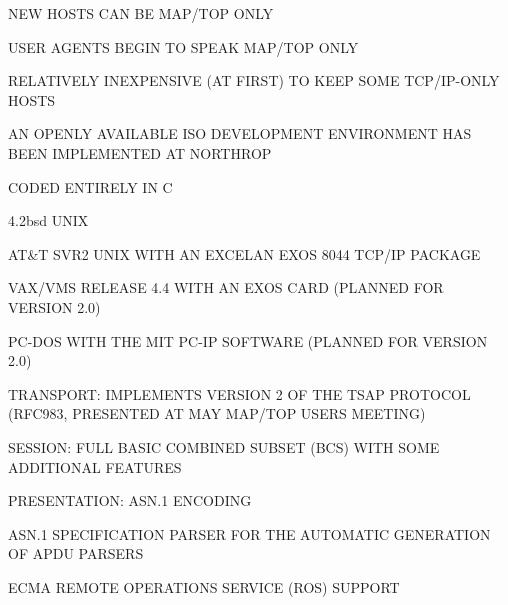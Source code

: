 \begin{bwslide}

\begin{nrtc}
\item	NEW HOSTS CAN BE MAP/TOP ONLY
\item	USER AGENTS BEGIN TO SPEAK MAP/TOP ONLY
\item	RELATIVELY INEXPENSIVE (AT FIRST) TO KEEP SOME
	TCP/IP-ONLY HOSTS
\end{nrtc}
\end{bwslide}


\begin{bwslide}

\begin{nrtc}
\item	AN OPENLY AVAILABLE ISO DEVELOPMENT
	ENVIRONMENT HAS BEEN IMPLEMENTED
	AT NORTHROP
\item	CODED ENTIRELY IN C
\end{nrtc}
\end{bwslide}


\begin{bwslide}

\begin{nrtc}
\item 4.2bsd UNIX
\item AT\&T SVR2 UNIX WITH AN EXCELAN EXOS 8044 TCP/IP PACKAGE
\item VAX/VMS RELEASE 4.4 WITH AN EXOS CARD (PLANNED FOR VERSION 2.0)
\item PC-DOS WITH THE MIT PC-IP SOFTWARE (PLANNED FOR VERSION 2.0)
\end{nrtc}
\end{bwslide}


\begin{bwslide}

\begin{nrtc}
\item 	TRANSPORT: IMPLEMENTS VERSION 2 OF THE TSAP PROTOCOL (RFC983,
	PRESENTED AT MAY MAP/TOP USERS MEETING)
\item 	SESSION: FULL BASIC COMBINED SUBSET (BCS) WITH SOME ADDITIONAL
	FEATURES
\item	PRESENTATION: ASN.1 ENCODING
\end{nrtc}
\end{bwslide}


\begin{bwslide}

\begin {nrtc}
\item	ASN.1 SPECIFICATION PARSER FOR THE AUTOMATIC GENERATION
	OF APDU PARSERS
\item	ECMA REMOTE OPERATIONS SERVICE (ROS) SUPPORT
\end {nrtc}
\end{bwslide}


